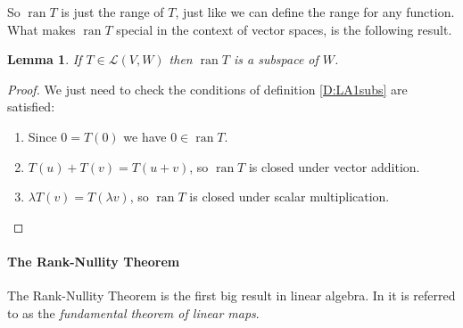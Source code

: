 \documentclass{article}
\theoremstyle{plain}
\newtheorem{lemma}[theorem]{Lemma}{\bfseries}{\upshape}
\newcommand{\cL}{\mathcal{L}}
\DeclareMathOperator{\ran}{\mathrm{ran}}
\begin{document}
So $\ran T$ is just the range of $T$, just like we can define the range for any function. What makes $\ran T$ special in the context of vector spaces, is the following result.

\begin{lemma}
If $T\in \cL(V,W)$ then $\ran T$ is a subspace of $W$.
\end{lemma}
\begin{proof}
We just need to check the conditions of definition \ref{D:LA1subs} are satisfied: 
\begin{enumerate}
\item Since $0= T(0)$ we have $0\in \ran T$.
\item $T(u) + T(v) = T(u + v)$, so $\ran T$ is closed under vector addition.
\item $\lambda T(v) = T(\lambda v)$, so $\ran T$ is closed under scalar multiplication.
\end{enumerate}
\end{proof}

\paragraph{The Rank-Nullity Theorem}
The Rank-Nullity Theorem is the first big result in linear algebra. In \cite{Ax15} it is referred to as the \emph{fundamental theorem of linear maps}. 
\end{document}
